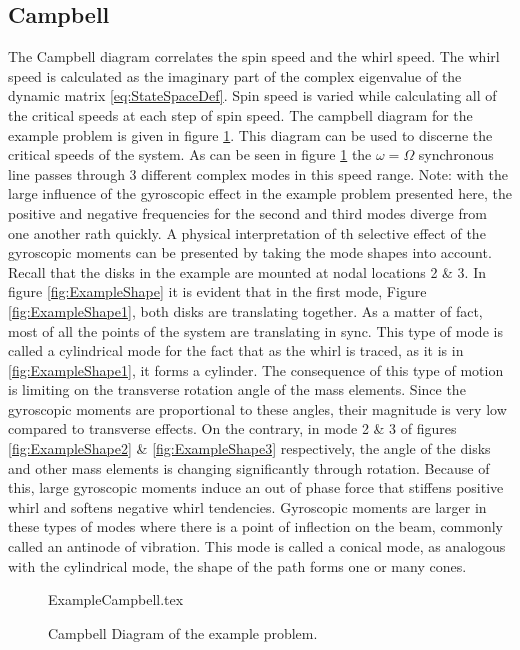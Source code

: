 \subsection{Campbell}
The Campbell diagram correlates the spin speed and the whirl speed. The whirl speed is calculated as the imaginary part of the complex eigenvalue of the dynamic matrix \eqref{eq:StateSpaceDef}. Spin speed is varied while calculating all of the critical speeds at each step of spin speed. The campbell diagram for the example problem is given in figure \ref{fig:ExampleCampbell}. This diagram can be used to discerne the critical speeds of the system. As can be seen in figure \ref{fig:ExampleCampbell} the $ \omega=\Omega $ synchronous line passes through 3 different complex modes in this speed range. Note: with the large influence of the gyroscopic effect in the example problem presented here, the positive and negative frequencies for the second and third modes diverge from one another rath quickly. A physical interpretation of th selective effect of the gyroscopic moments can be presented by taking the mode shapes into account. Recall that the disks in the example are mounted at nodal locations 2 \& 3. In figure \ref{fig:ExampleShape} it is evident that in the first mode, Figure \ref{fig:ExampleShape1}, both disks are translating together. As a matter of fact, most of all the points of the system are translating in sync. This type of mode is called a cylindrical mode for the fact that as the whirl is traced, as it is in \ref{fig:ExampleShape1}, it forms a cylinder. The consequence of this type of motion is limiting on the transverse rotation angle of the mass elements. Since the gyroscopic moments are proportional to these angles, their magnitude is very low compared to transverse effects. On the contrary, in mode 2 \& 3 of figures \ref{fig:ExampleShape2} \& \ref{fig:ExampleShape3} respectively, the angle of the disks and other mass elements is changing significantly through rotation. Because of this, large gyroscopic moments induce an out of phase force that stiffens positive whirl and softens negative whirl tendencies. Gyroscopic moments are larger in these types of modes where there is a point of inflection on the beam, commonly called an antinode of vibration. This mode is called a conical mode, as analogous with the cylindrical mode, the shape of the path forms one or many cones.\par 
\begin{figure}[!htb]
	\def\width{.7*\linewidth}
	\def\height{.4*\linewidth}
	\def\sep{3em}
	\centering
	{ExampleCampbell.tex}
	\caption{Campbell Diagram of the example problem.}
	\label{fig:ExampleCampbell}
\end{figure}
